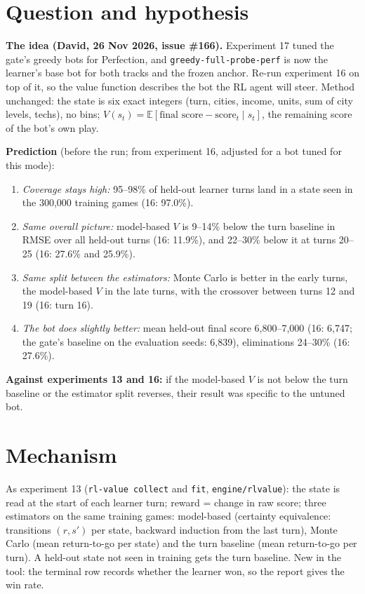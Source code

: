 \documentclass{../polyexp}
\begin{document}

\ExpHeader

\section{Question and hypothesis}
\textbf{The idea (David, 26 Nov 2026, issue \#166).} Experiment 17 tuned the gate's greedy bots for Perfection, and
\texttt{greedy-full-probe-perf} is now the learner's base bot for both tracks and the frozen anchor. Re-run experiment
16 on top of it, so the value function describes the bot the RL agent will steer. Method unchanged: the state is six
exact integers (turn, cities, income, units, sum of city levels, techs), no bins; $V(s_t) = \mathbb{E}[\text{final
score} - \text{score}_t \mid s_t]$, the remaining score of the bot's own play.

\textbf{Prediction} (before the run; from experiment 16, adjusted for a bot tuned for this mode):
\begin{enumerate}
  \item \emph{Coverage stays high:} 95--98\% of held-out learner turns land in a state seen in the 300{,}000
        training games (16: 97.0\%).
  \item \emph{Same overall picture:} model-based $V$ is 9--14\% below the turn baseline in RMSE over all held-out
        turns (16: 11.9\%), and 22--30\% below it at turns 20--25 (16: 27.6\% and 25.9\%).
  \item \emph{Same split between the estimators:} Monte Carlo is better in the early turns, the model-based $V$ in
        the late turns, with the crossover between turns 12 and 19 (16: turn 16).
  \item \emph{The bot does slightly better:} mean held-out final score 6{,}800--7{,}000 (16: 6{,}747; the gate's
        baseline on the evaluation seeds: 6{,}839), eliminations 24--30\% (16: 27.6\%).
\end{enumerate}
\textbf{Against experiments 13 and 16:} if the model-based $V$ is not below the turn baseline or the estimator split
reverses, their result was specific to the untuned bot.

\section{Mechanism}
As experiment 13 (\texttt{rl-value collect} and \texttt{fit}, \texttt{engine/rlvalue}): the state is read at the start
of each learner turn; reward = change in raw score; three estimators on the same training games: model-based
(certainty equivalence: transitions $(r, s')$ per state, backward induction from the last turn), Monte Carlo
(mean return-to-go per state) and the turn baseline (mean return-to-go per turn). A held-out state not seen in
training gets the turn baseline. New in the tool: the terminal row records whether the learner won, so the report
gives the win rate.
\end{document}
